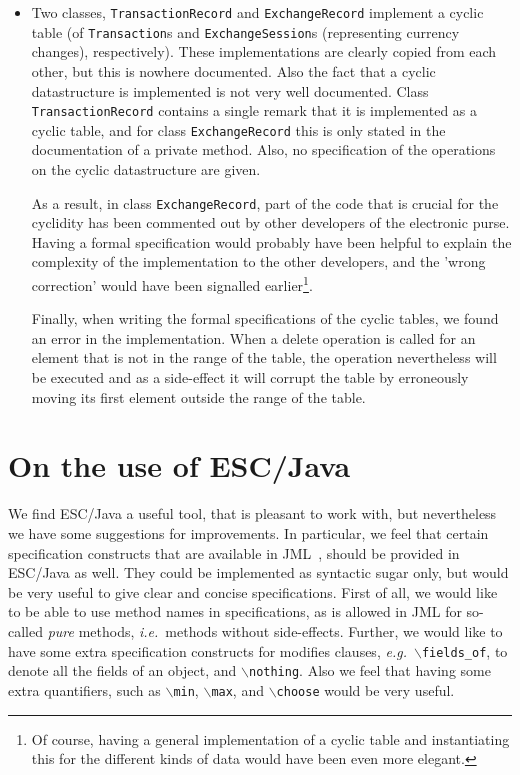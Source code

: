 \documentclass[a4paper]{llncs}
\newcommand{\noth}{\(\backslash\)\texttt{nothing}}
\newcommand{\fieldsof}{\(\backslash\)\texttt{fields\_of}}
\begin{document}
\begin{itemize}
\item Two classes, \texttt{TransactionRecord} and
\texttt{ExchangeRecord} implement a cyclic table (of
\texttt{Transaction}s and
\texttt{ExchangeSession}s (representing currency changes),
respectively).  These implementations are clearly copied from each
other, but this is nowhere documented. Also the fact that a
cyclic datastructure is implemented is not very well documented. Class
\texttt{TransactionRecord} contains a single remark that it is
implemented as a cyclic table, and for class
\texttt{ExchangeRecord} this is only stated in the documentation of a
private method. Also, no specification of the operations on the cyclic
datastructure are given.

As a result, in class \texttt{ExchangeRecord}, part of the code that
is crucial for the cyclidity has been commented out by other
developers of the electronic purse. Having a formal specification
would probably have been helpful to explain the complexity of the
implementation to the other developers, and the 'wrong correction'
would have been signalled earlier\footnote{Of course, having a general 
implementation of a cyclic table and instantiating this for the
different kinds of data would have been even more elegant.}.

Finally, when writing the formal specifications of the cyclic tables,
we found an error in the implementation. When a delete operation is
called for an element that is not in the range of the table, the
operation nevertheless will be executed and as a side-effect it will
corrupt the table by erroneously moving its first element outside the
range of the table.
\end{itemize}


\section{On the use of ESC/Java}
\label{SectESC}
We find ESC/Java a useful tool, that is pleasant to work
with, but nevertheless we have some suggestions for improvements. In
particular, we feel that certain specification constructs that are
available in JML~\cite{LeavensBR99}, should be provided in ESC/Java as 
well. They could be implemented as syntactic sugar only, but would be
very useful to give clear and concise specifications.
First of all, we would like to be able to use method names in
specifications, as is allowed in JML for so-called
\emph{pure} methods, \emph{i.e.}~methods without
side-effects. Further, we would like to have some extra specification
constructs for modifies clauses, \emph{e.g.}~\fieldsof, to denote all
the fields of an object, and \noth. Also we feel that having some
extra quantifiers, such as \texttt{\(\backslash\)min},
\texttt{\(\backslash\)max}, and \texttt{\(\backslash\)choose} would be 
very useful.
\end{document}
